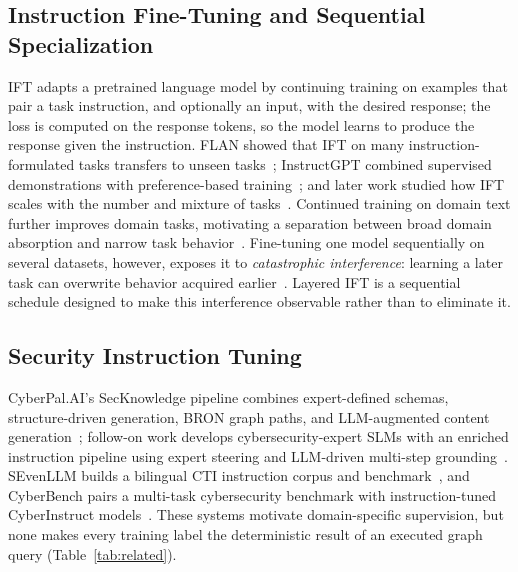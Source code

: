 \documentclass[conference]{IEEEtran}
\begin{document}
\subsection{Instruction Fine-Tuning and Sequential Specialization}
IFT adapts a pretrained language model by continuing training on examples that pair a task instruction, and optionally an input, with the desired response; the loss is computed on the response tokens, so the model learns to produce the response given the instruction. FLAN showed that IFT on many instruction-formulated tasks transfers to unseen tasks~\cite{wei2022flan}; InstructGPT combined supervised demonstrations with preference-based training~\cite{ouyang2022training}; and later work studied how IFT scales with the number and mixture of tasks~\cite{chung2024scaling}. Continued training on domain text further improves domain tasks, motivating a separation between broad domain absorption and narrow task behavior~\cite{gururangan2020dont}. Fine-tuning one model sequentially on several datasets, however, exposes it to \emph{catastrophic interference}: learning a later task can overwrite behavior acquired earlier~\cite{mccloskey1989catastrophic}. Layered IFT is a sequential schedule designed to make this interference observable rather than to eliminate it.

\subsection{Security Instruction Tuning}
CyberPal.AI's SecKnowledge pipeline combines expert-defined schemas, structure-driven generation, BRON graph paths, and LLM-augmented content generation~\cite{levi2025cyberpal}; follow-on work develops cybersecurity-expert SLMs with an enriched instruction pipeline using expert steering and LLM-driven multi-step grounding~\cite{levi2025slm}. SEvenLLM builds a bilingual CTI instruction corpus and benchmark~\cite{ji2024sevenllm}, and CyberBench pairs a multi-task cybersecurity benchmark with instruction-tuned CyberInstruct models~\cite{liu2024cyberbench}. These systems motivate domain-specific supervision, but none makes every training label the deterministic result of an executed graph query (Table~\ref{tab:related}).
\end{document}
